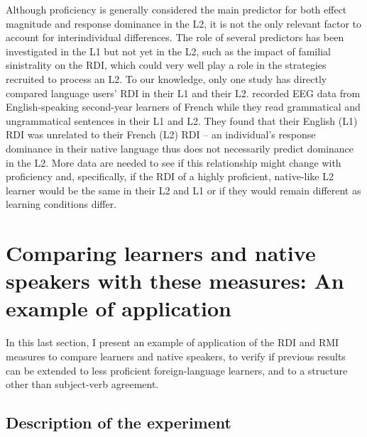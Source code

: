 \documentclass[output=paper,colorlinks,citecolor=brown,modfonts,nonflat]{../langscibook}
\begin{document}
Although proficiency is generally considered the main predictor for both effect magnitude and response dominance in the L2, it is not the only relevant factor to account for interindividual differences. The role of several predictors has been investigated in the L1 but not yet in the L2, such as the impact of familial sinistrality on the RDI, which could very well play a role in the strategies recruited to process an L2. To our knowledge, only one study has directly compared language users’ RDI in their L1 and their L2. \citet{WamplerEtAl2014} recorded EEG data from English-speaking second-year learners of French while they read grammatical and ungrammatical sentences in their L1 and L2. They found that their English (L1) RDI was unrelated to their French (L2) RDI – an individual’s response dominance in their native language thus does not necessarily predict dominance in the L2. More data are needed to see if this relationship might change with proficiency and, specifically, if the RDI of a highly proficient, native-like L2 learner would be the same in their L2 and L1 or if they would remain different as learning conditions differ.   

\section{Comparing learners and native speakers with these measures: An example of application}


In this last section, I present an example of application of the RDI and RMI measures to compare learners and native speakers, to verify if previous results can be extended to less proficient foreign-language learners, and to a structure other than subject-verb agreement.

\subsection{Description of the experiment}
\end{document}
